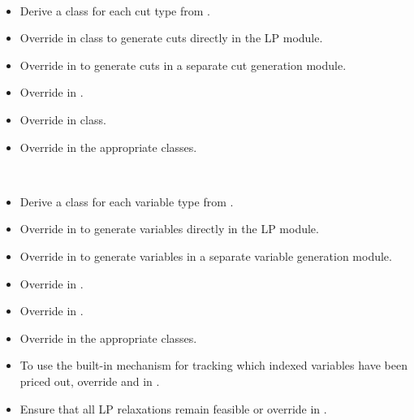 \begin{description}
  \setlength{\itemsep}{2.5ex}

\item[Perform cut generation]\ \\
  \vspace{-4ex}
  \begin{itemize}
    \setlength{\itemindent}{-4ex}
    \setlength{\itemsep}{-.5ex}
  \item Derive a class for each cut type from .
  \item Override  in
     class to generate cuts directly in the LP module.
  \item Override  in  
    to generate cuts in a separate cut generation module.
  \item Override  in .
  \item Override  in  class.
  \item Override  in the appropriate 
 classes.
  \end{itemize}

\item[Perform column generation]\ \\
  \vspace{-4ex}
  \begin{itemize}
    \setlength{\itemindent}{-4ex}
    \setlength{\itemsep}{-.5ex}
  \item Derive a class for each variable type from .
  \item Override  in  
    to generate variables directly in the LP module.
  \item Override  in  
    to generate variables in a separate variable generation module.
  \item Override  in .
  \item Override  in .
  \item Override  in the appropriate 
     classes.
  \item To use the built-in mechanism for tracking which indexed
    variables have been priced out, override 
    and  in .
  \item Ensure that all LP relaxations remain feasible or
    override  in .
  \end{itemize}


\end{description}
